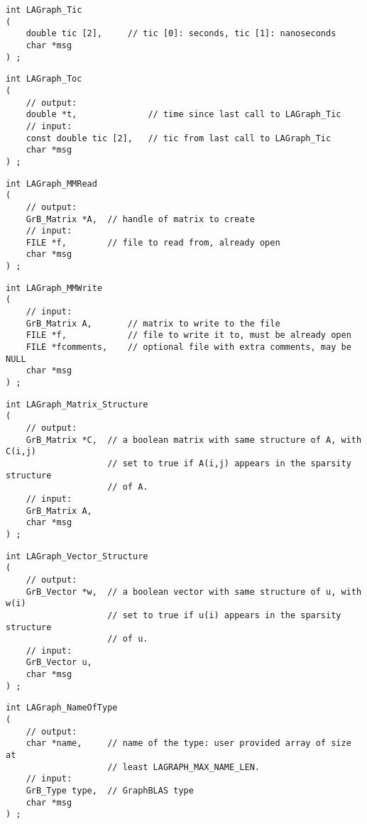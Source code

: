 \begin{verbatim}
int LAGraph_Tic
(
    double tic [2],     // tic [0]: seconds, tic [1]: nanoseconds
    char *msg
) ;
\end{verbatim}




\begin{verbatim}
int LAGraph_Toc
(
    // output:
    double *t,              // time since last call to LAGraph_Tic
    // input:
    const double tic [2],   // tic from last call to LAGraph_Tic
    char *msg
) ;
\end{verbatim}




\begin{verbatim}
int LAGraph_MMRead
(
    // output:
    GrB_Matrix *A,  // handle of matrix to create
    // input:
    FILE *f,        // file to read from, already open
    char *msg
) ;
\end{verbatim}




\begin{verbatim}
int LAGraph_MMWrite
(
    // input:
    GrB_Matrix A,       // matrix to write to the file
    FILE *f,            // file to write it to, must be already open
    FILE *fcomments,    // optional file with extra comments, may be NULL
    char *msg
) ;
\end{verbatim}




\begin{verbatim}
int LAGraph_Matrix_Structure
(
    // output:
    GrB_Matrix *C,  // a boolean matrix with same structure of A, with C(i,j)
                    // set to true if A(i,j) appears in the sparsity structure
                    // of A.
    // input:
    GrB_Matrix A,
    char *msg
) ;
\end{verbatim}




\begin{verbatim}
int LAGraph_Vector_Structure
(
    // output:
    GrB_Vector *w,  // a boolean vector with same structure of u, with w(i)
                    // set to true if u(i) appears in the sparsity structure
                    // of u.
    // input:
    GrB_Vector u,
    char *msg
) ;
\end{verbatim}




\begin{verbatim}
int LAGraph_NameOfType
(
    // output:
    char *name,     // name of the type: user provided array of size at
                    // least LAGRAPH_MAX_NAME_LEN.
    // input:
    GrB_Type type,  // GraphBLAS type
    char *msg
) ;
\end{verbatim}




